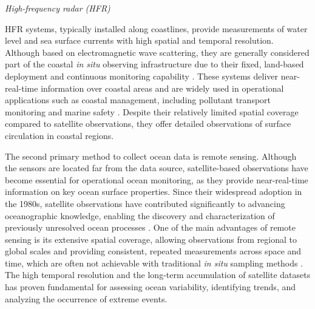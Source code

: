 \emph{High-frequency radar (HFR)}

HFR systems, typically installed along coastlines, provide measurements of water level and sea surface currents with high spatial and temporal resolution. Although based on electromagnetic wave scattering, they are generally considered part of the coastal \emph{in situ} observing infrastructure due to their fixed, land-based deployment and continuous monitoring capability \parencite{serafy2023eurogoos}. These systems deliver near-real-time information over coastal areas and are widely used in operational applications such as coastal management, including pollutant transport monitoring and marine safety \parencite{payandeh2023occurrence, serafy2023eurogoos}. Despite their relatively limited spatial coverage compared to satellite observations, they offer detailed observations of surface circulation in coastal regions.

The second primary method to collect ocean data is remote sensing. Although the sensors are located far from the data source, satellite-based observations have become essential for operational ocean monitoring, as they provide near-real-time information on key ocean surface properties. Since their widespread adoption in the 1980s, satellite observations have contributed significantly to advancing oceanographic knowledge, enabling the discovery and characterization of previously unresolved ocean processes \parencite{robinson2010introduction}. One of the main advantages of remote sensing is its extensive spatial coverage, allowing observations from regional to global scales and providing consistent, repeated measurements across space and time, which are often not achievable with traditional \emph{in situ} sampling methods \parencite{avouris2025advancements}. The high temporal resolution and the long-term accumulation of satellite datasets has proven fundamental for assessing ocean variability, identifying trends, and analyzing the occurrence of extreme events.

